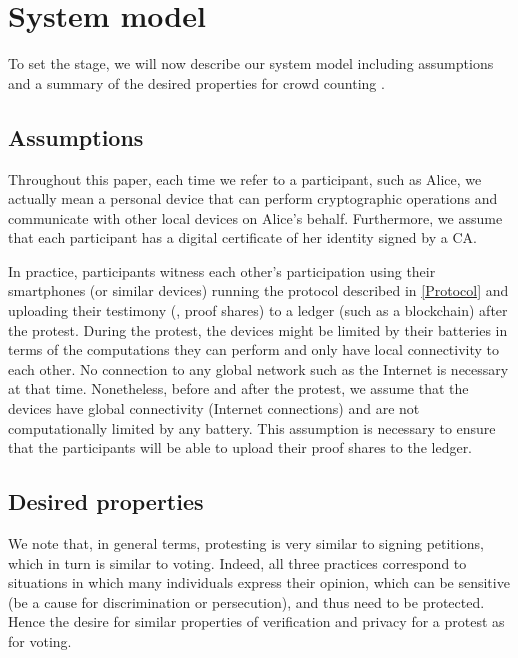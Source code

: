 \section{System model}%
\label{system-model}

To set the stage, we will now describe our system model including
assumptions and a summary of the desired properties for crowd
counting%
.

\subsection{Assumptions}%
\label{assumptions}

Throughout this paper, each time we refer to a participant, such as Alice, we actually mean a personal device that can perform cryptographic operations and communicate with other local devices on Alice's behalf. 
Furthermore, we assume that each participant has a digital certificate of her identity signed by a \ac{CA}.

In practice, participants witness each other's participation using their smartphones (or similar devices) running the protocol described in \cref{Protocol} and uploading their testimony (\ie, proof shares) to a ledger (such as a blockchain) after the protest. 
During the protest, the devices might be limited by their batteries in terms of the computations they can perform and only have local connectivity to each other.
No connection to any global network such as the Internet is necessary at that time.  
Nonetheless, before and after the protest, we assume that the devices have global connectivity (\ie Internet connections) and are not computationally limited by any battery.
This assumption is necessary to ensure that the participants will be able to upload their proof shares to the ledger.

\subsection{Desired properties}%
\label{desired-properties}

We note that, in general terms, protesting is very similar to signing petitions, which 
in turn is similar to voting.
Indeed, all three practices correspond to situations in which many individuals express their opinion, which can be sensitive (\eg be a cause for discrimination or persecution), and thus need to be protected.
Hence the desire for similar properties of verification and privacy for a protest as for voting.

